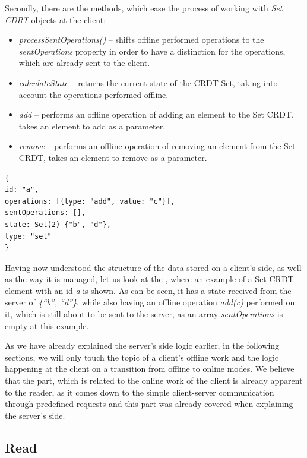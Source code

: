 Secondly, there are the methods, which ease the process of working with \textit{Set CDRT} objects at the client: 

         \begin{itemize}
         \item \textit{processSentOperations()} -- shifts offline performed operations to the \textit{sentOperations} property in order to have a distinction for the operations, which are already sent to the client.
         \item \textit{calculateState} -- returns the current state of the CRDT Set, taking into account the operations performed offline.
         \item \textit{add} -- performs an offline operation of adding an element to the Set CRDT, takes an element to add as a parameter.
          \item \textit{remove} -- performs an offline operation of removing an element from the Set CRDT, takes an element to remove as a parameter.
     \end{itemize}

\begin{lstlisting}[caption={An example of a \textit{SetCRDT} object, stored on a client's side.}, label={lst:dev8}]
{
id: "a",
operations: [{type: "add", value: "c"}],
sentOperations: [],
state: Set(2) {"b", "d"},
type: "set"
}
\end{lstlisting}
     
Having now understood the structure of the data stored on a client's side, as well as the way it is managed, let us look at the , where an example of a Set CRDT element with an id \textit{a} is shown. As can be seen, it has a state received from the server of \textit{\{``b'', ``d''\}}, while also having an offline operation \textit{add(c)} performed on it, which is still about to be sent to the server, as an array \textit{sentOperations} is empty at this example.

As we have already explained the server's side logic earlier, in the following sections, we will only touch the topic of a client's offline work and the logic happening at the client on a transition from offline to online modes. We believe that the part, which is related to the online work of the client is already apparent to the reader, as it comes down to the simple client-server communication through predefined requests and this part was already covered when explaining the server's side. 

\subsection*{Read}

